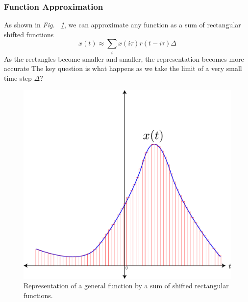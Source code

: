 \subsubsection{Function Approximation}
As shown in \emph{Fig. ~\ref{fig:func_rect}}, we can approximate any function as a sum of rectangular shifted functions
    \begin{equation}
        x(t) \approx \sum_i x(i\tau) r(t - i\tau) \Delta
    \end{equation}
 As the rectangles become smaller and smaller, the representation becomes more accurate
 The key question is what happens as we take the limit of a very small time step $\Delta$?
\begin{figure}[tb]
\centering
\includegraphics[width=.55\columnwidth]{func_rect}
\caption{Representation of a general function by a sum of shifted rectangular functions. }
\label{fig:func_rect}
\end{figure}
